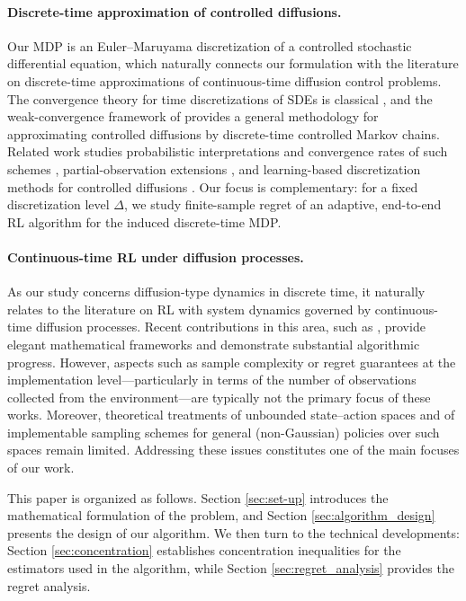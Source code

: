 \documentclass[final,supplement]{siamart251216}
\begin{document}
\paragraph{Discrete-time approximation of controlled diffusions.} Our MDP is an Euler--Maruyama discretization of a controlled stochastic differential equation, which naturally connects our formulation with the literature on discrete-time approximations of continuous-time diffusion control problems. The convergence theory for time discretizations of SDEs is classical \cite{kloeden1992numerical}, and the weak-convergence framework of \cite{kushner2001numerical} provides a general methodology for approximating controlled diffusions by discrete-time controlled Markov chains. Related work studies probabilistic interpretations and convergence rates of such schemes \cite{tan2014discrete}, partial-observation extensions \cite{li2024discrete}, and learning-based discretization methods for controlled diffusions \cite{kara2023qlearning,pradhan2025discrete,bayraktar2026reinforcement}. Our focus is complementary: for a fixed discretization level $\Delta$, we study finite-sample regret of an adaptive, end-to-end RL algorithm for the induced discrete-time MDP.

\paragraph{Continuous-time RL under diffusion processes.} As our study concerns diffusion-type dynamics in discrete time, it naturally relates to the literature on RL with system dynamics governed by continuous-time diffusion processes. Recent contributions in this area, such as \cite{wang2020reinforcement,jia2023q,dai2025data,jia2022policy,huang2025sublinear,han2023choquet}, provide elegant mathematical frameworks and demonstrate substantial algorithmic progress. However, aspects such as sample complexity or regret guarantees at the implementation level—particularly in terms of the number of observations collected from the environment—are typically not the primary focus of these works. Moreover, theoretical treatments of unbounded state–action spaces and of implementable sampling schemes for general (non-Gaussian) policies over such spaces remain limited. Addressing these issues constitutes one of the main focuses of our work.


\vspace{10pt}
This paper is organized as follows. Section \ref{sec:set-up} introduces the mathematical formulation of the problem, and Section \ref{sec:algorithm_design} presents the design of our algorithm. We then turn to the technical developments: Section \ref{sec:concentration} establishes concentration inequalities for the estimators used in the algorithm, while Section \ref{sec:regret_analysis} provides the regret analysis.
\end{document}

